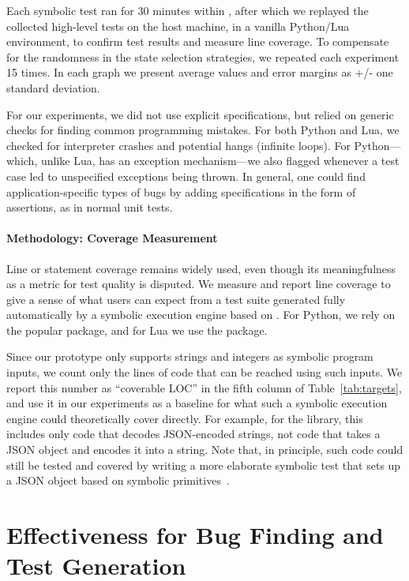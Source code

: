 Each symbolic test ran for 30 minutes within \chef, after which we replayed the collected high-level tests on the host machine, in a vanilla Python/Lua environment, to confirm test results and measure line coverage.  To compensate for the randomness in the state selection strategies, we repeated each experiment 15 times.  In each graph we present average values and error margins as +/- one standard deviation.

For our experiments, we did not use explicit specifications, but relied on generic checks for finding common programming mistakes.  For both Python and Lua, we checked for interpreter crashes and potential hangs (infinite loops). 
For Python---which, unlike Lua, has an exception mechanism---we also flagged whenever a test case led to unspecified exceptions being thrown.
%
In general, one could find application-specific types of bugs by adding specifications in the form of assertions, as in normal unit tests.

\paragraph{Methodology: Coverage Measurement}

Line or statement coverage remains widely used, even though its meaningfulness as a metric for test quality is disputed. We measure and report line coverage to give a sense of what users can expect from a test suite generated fully automatically by a symbolic execution engine based on \chef.  For Python, we rely on the popular  package, and for Lua we use the  package.

Since our prototype only supports strings and integers as symbolic program inputs, we count only the lines of code that can be reached using such inputs. We report this number as ``coverable LOC'' in the fifth column of Table~\ref{tab:targets}, and use it in our experiments as a baseline for what such a symbolic execution engine could theoretically cover directly.  For example, for the  library, this includes only code that decodes JSON-encoded strings, not code that takes a JSON object and encodes it into a string. Note that, in principle, such code could still be tested and covered by writing a more elaborate symbolic test that sets up a JSON object based on symbolic primitives~\cite{paas-testing}.


\section{Effectiveness for Bug Finding and Test Generation}
\label{sec:eval:bug-finding}

